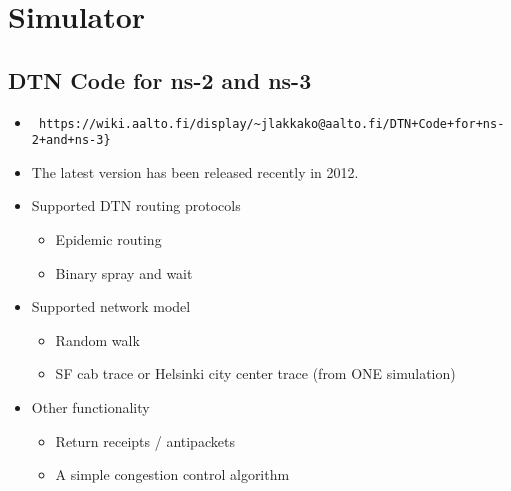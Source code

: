 \documentclass[11pt]{article}
\begin{document}
\section{Simulator}
\subsection{DTN Code for ns-2 and ns-3}
\begin{itemize}
\item \begin{verbatim} https://wiki.aalto.fi/display/~jlakkako@aalto.fi/DTN+Code+for+ns-2+and+ns-3} \end{verbatim}
\item The latest version has been released recently in 2012.
\item Supported DTN routing protocols
  \begin{itemize}
  \item Epidemic routing
  \item Binary spray and wait
  \end{itemize}

\item Supported network model
  \begin{itemize}
  \item Random walk
  \item SF cab trace or Helsinki city center trace (from ONE simulation)
  \end{itemize}

\item Other functionality
  \begin{itemize}
  \item Return receipts / antipackets
  \item A simple congestion control algorithm
  \end{itemize}  
\end{itemize}
\end{document}
